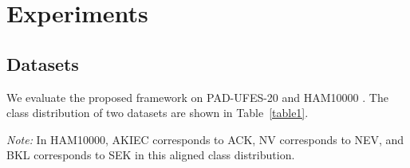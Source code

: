 \documentclass[preprint,12pt]{elsarticle}
\makeatletter
\def@NAT@last@yr{--\NAT@penalty}%
\makeatother
\begin{document}
\section{Experiments}

\subsection{Datasets}


We evaluate the proposed framework on PAD-UFES-20 and HAM10000 \cite{tschandl2018ham10000,pacheco2020padufes20}. The class distribution of two datasets are shown in Table~\ref{table1}.
\begin{table}[!htbp]
	\centering
	\renewcommand{\arraystretch}{1.15}
	\caption{Class distribution of PAD-UFES-20 and HAM10000.}
	\vspace{1pt}
	\setlength{\tabcolsep}{4pt}
	\small
	
	\vspace{3pt}
	\begin{minipage}{0.98\textwidth}
		\footnotesize
		\textit{Note:} In HAM10000, AKIEC corresponds to ACK, NV corresponds to NEV, and BKL corresponds to SEK in this aligned class distribution.
	\end{minipage}
	\label{table1}
\end{table}
\end{document}
